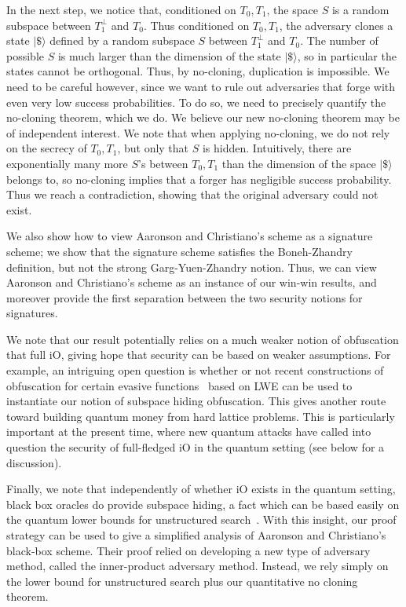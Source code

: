In the next step, we notice that, conditioned on $T_0,T_1$, the space $S$ is a random subspace between $T_1^\bot$ and $T_0$.  Thus conditioned on $T_0,T_1$, the adversary clones a state $|\$\rangle$ defined by a random subspace $S$ between $T_1^\bot$ and $T_0$.  The number of possible $S$ is much larger than the dimension of the state $|\$\rangle$, so in particular the states cannot be orthogonal.  Thus, by no-cloning, duplication is impossible.  We need to be careful however, since we want to rule out adversaries that forge with even very low success probabilities.  To do so, we need to precisely quantify the no-cloning theorem, which we do.  We believe our new no-cloning theorem may be of independent interest.  We note that when applying no-cloning, we do not rely on the secrecy of $T_0,T_1$, but only that $S$ is hidden.  Intuitively, there are exponentially many more $S$'s between $T_0,T_1$ than the dimension of the space $|\$\rangle$ belongs to, so no-cloning implies that a forger has negligible success probability. Thus we reach a contradiction, showing that the original adversary could not exist.

\medskip

We also show how to view Aaronson and Christiano's scheme as a signature scheme; we show that the signature scheme satisfies the Boneh-Zhandry definition, but not the strong Garg-Yuen-Zhandry notion.  Thus, we can view Aaronson and Christiano's scheme as an instance of our win-win results, and moreover provide the first separation between the two security notions for signatures.

We note that our result potentially relies on a much weaker notion of obfuscation that full iO, giving hope that security can be based on weaker assumptions.  For example, an intriguing open question is whether or not recent constructions of obfuscation for certain evasive functions~\cite{EPRINT:WicZir17,EPRINT:GoyKopWat17} based on LWE can be used to instantiate our notion of subspace hiding obfuscation.  This gives another route toward building quantum money from hard lattice problems.  This is particularly important at the present time, where new quantum attacks have called into question the security of full-fledged iO in the quantum setting (see below for a discussion).  

Finally, we note that independently of whether iO exists in the quantum setting, black box oracles do provide subspace hiding, a fact which can be based easily on the quantum lower bounds for unstructured search~\cite{BBBV97}.  With this insight, our proof strategy can be used to give a simplified analysis of Aaronson and Christiano's black-box scheme.  Their proof relied on developing a new type of adversary method, called the inner-product adversary method.  Instead, we rely simply on the lower bound for unstructured search plus our quantitative no cloning theorem.

